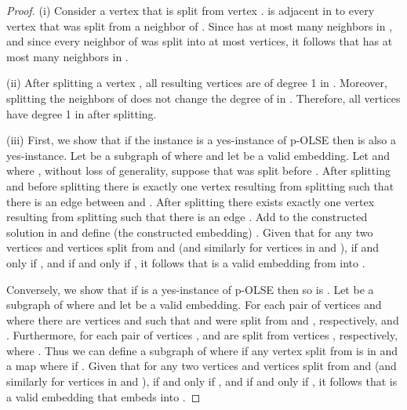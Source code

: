 \documentclass[11pt]{article}
\begin{document}
\begin{proof}
(i) Consider a vertex  that is split from vertex .  is adjacent in  to every vertex that was split from a neighbor of .  Since  has at most  many neighbors in , and since every neighbor of  was split into at most  vertices, it follows that  has at most  many neighbors in .

(ii) After splitting a vertex , all resulting vertices are of degree 1 in .  Moreover,  splitting the neighbors of  does not change the degree of  in .  Therefore, all vertices have degree 1 in  after splitting.

(iii) First, we show that if the instance  is a yes-instance of p-OLSE then  is also a yes-instance.  Let  be a subgraph of  where  and let  be a valid embedding.  Let  and  where , without loss of generality, suppose that  was split before .  After splitting  and before splitting  there is exactly one vertex  resulting from splitting  such that there is an edge between  and .  After splitting  there exists exactly one vertex  resulting from splitting  such that there is an edge .  Add  to the constructed solution  in   and define (the constructed embedding) .  Given that for any two vertices  and vertices  split from  and  (and similarly for vertices in  and ),  if and only if , and  if and only if , it follows that  is a valid embedding from  into .

Conversely, we show that if  is a yes-instance of p-OLSE then so is .  Let  be a subgraph of  where  and let  be a valid embedding.  For each pair of vertices  and  where  there are vertices  and  such that  and  were split from  and , respectively, and .  Furthermore, for each pair of vertices ,  and  are split from vertices , respectively, where .  Thus we can define a subgraph  of  where  if any vertex  split from  is in  and a map  where  if .  Given that for any two vertices  and vertices  split from  and  (and similarly for vertices in  and ),  if and only if , and  if and only if , it follows that  is a valid embedding that embeds  into .
\end{proof}
\end{document}
